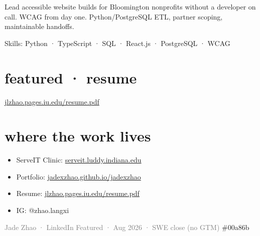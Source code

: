 \documentclass[11pt,letterpaper]{article}
\begin{document}
Lead accessible website builds for Bloomington nonprofits without a developer on call. WCAG from day one. Python/PostgreSQL ETL, partner scoping, maintainable handoffs.

Skills: Python · TypeScript · SQL · React.js · PostgreSQL · WCAG

\section*{\color{jade}featured · resume}
\href{https://jlzhao.pages.iu.edu/resume.pdf}{jlzhao.pages.iu.edu/resume.pdf}

\section*{\color{jade}where the work lives}
\begin{itemize}[leftmargin=1.2em,itemsep=2pt]
\item ServeIT Clinic: \href{https://serveit.luddy.indiana.edu/}{serveit.luddy.indiana.edu}
\item Portfolio: \href{https://jadexzhao.github.io/jadexzhao/}{jadexzhao.github.io/jadexzhao}
\item Resume: \href{https://jlzhao.pages.iu.edu/resume.pdf}{jlzhao.pages.iu.edu/resume.pdf}
\item IG: @zhao.langxi
\end{itemize}

\vspace*{\fill}
\noindent\textcolor{gray}{\footnotesize Jade Zhao · LinkedIn Featured · Aug 2026 · SWE close (no GTM)}
\hfill\textcolor{jade}{\footnotesize \#00a86b}
\end{document}
